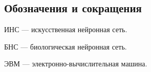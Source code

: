 \begin{center}
\section*{Обозначения и сокращения}
\end{center}

ИНС --- искусственная нейронная сеть.

БНС --- биологическая нейронная сеть.

ЭВМ --- электронно-вычислительная машина.


\newpage